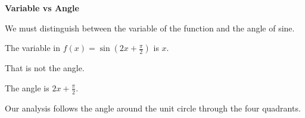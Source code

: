 \documentclass{ximera}
\begin{document}
\begin{warning} \textbf{\textcolor{red!70!black}{Variable vs Angle}}


We must distinguish between the variable of the function and the angle of sine.

The variable in $f(x) = \sin\left( 2 x + \frac{\pi}{2} \right)$ is $x$.

That is not the angle.

The angle is $2 x + \frac{\pi}{2}$.

Our analysis follows the angle around the unit circle through the four quadrants.

\end{warning}
\end{document}
